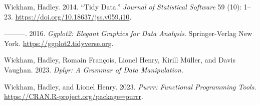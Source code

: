 \begin{CSLReferences}{1}{0}
\leavevmode{}%
Wickham, Hadley. 2014. {``Tidy Data.''} \emph{Journal of Statistical Software} 59 (10): 1--23. \url{https://doi.org/10.18637/jss.v059.i10}.

\leavevmode{}%
---------. 2016. \emph{Ggplot2: Elegant Graphics for Data Analysis}. Springer-Verlag New York. \url{https://ggplot2.tidyverse.org}.

\leavevmode{}%
Wickham, Hadley, Romain François, Lionel Henry, Kirill Müller, and Davis Vaughan. 2023. \emph{Dplyr: A Grammar of Data Manipulation}.

\leavevmode{}%
Wickham, Hadley, and Lionel Henry. 2023. \emph{Purrr: Functional Programming Tools}. \url{https://CRAN.R-project.org/package=purrr}.

\end{CSLReferences}



\address{%
Krisanat Anukarnsakulchularp\\
Monash University\\%
Department of Econometrics and Business Statistics\\ Melbourne, Australia\\
%
%
\textit{ORCiD: \href{https://orcid.org/0009-0008-5638-7124}{0009-0008-5638-7124}}\\%
\href{mailto:kanu0003@student.monash.edu}{\nolinkurl{kanu0003@student.monash.edu}}%
}
